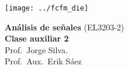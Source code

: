 \documentclass[
  11pt,
  letterpaper,
   addpoints,
  ]{exam}
\begin{document}
\noindent
\begin{minipage}{0.47\textwidth}
\texttt{[image: ../fcfm\_die]}
\end{minipage}
\begin{minipage}{0.53\textwidth}
\begin{center} 
\large\textbf{Análisis de señales} (EL3203-2) \\
\large\textbf{Clase auxiliar 2} \\
\normalsize Prof.~Jorge Silva.\\
\normalsize Prof.~Aux.~Erik Sáez
\end{center}
\end{minipage}

\vspace{0.5cm}
\noindent
\vspace{.85cm}
\end{document}
